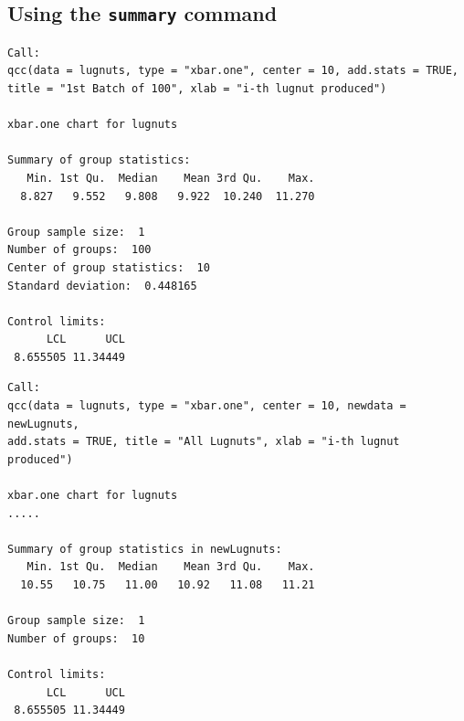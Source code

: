 \documentclass[]{article}
\begin{document}
\subsection{Using the \texttt{summary} command}
\begin{framed}
\begin{verbatim}
Call:
qcc(data = lugnuts, type = "xbar.one", center = 10, add.stats = TRUE,     
title = "1st Batch of 100", xlab = "i-th lugnut produced")

xbar.one chart for lugnuts 

Summary of group statistics:
   Min. 1st Qu.  Median    Mean 3rd Qu.    Max. 
  8.827   9.552   9.808   9.922  10.240  11.270 

Group sample size:  1
Number of groups:  100
Center of group statistics:  10
Standard deviation:  0.448165 

Control limits:
      LCL      UCL
 8.655505 11.34449
\end{verbatim}
\end{framed}
\begin{framed}
\begin{verbatim}
Call:
qcc(data = lugnuts, type = "xbar.one", center = 10, newdata = newLugnuts,     
add.stats = TRUE, title = "All Lugnuts", xlab = "i-th lugnut produced")

xbar.one chart for lugnuts 
.....

Summary of group statistics in newLugnuts:
   Min. 1st Qu.  Median    Mean 3rd Qu.    Max. 
  10.55   10.75   11.00   10.92   11.08   11.21 

Group sample size:  1
Number of groups:  10 

Control limits:
      LCL      UCL
 8.655505 11.34449

\end{verbatim}
\end{framed}
\newpage
\end{document}
